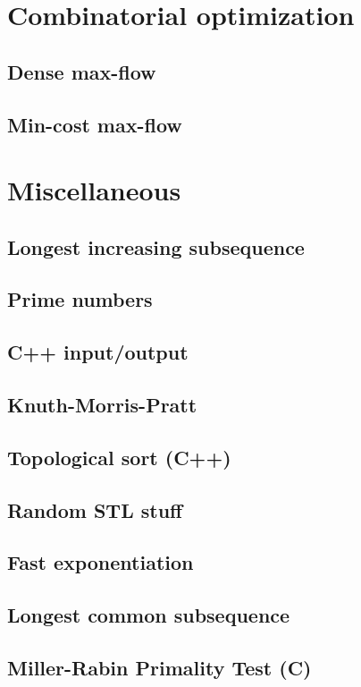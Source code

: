 \section{Combinatorial optimization}
\subsection{Dense max-flow}
\raggedbottom
\hrulefill
\subsection{Min-cost max-flow}
\raggedbottom
\hrulefill

\section{Miscellaneous}
\subsection{Longest increasing subsequence}
\raggedbottom
\hrulefill
\subsection{Prime numbers}
\raggedbottom
\hrulefill
\subsection{C++ input/output}
\raggedbottom
\hrulefill
\subsection{Knuth-Morris-Pratt}
\raggedbottom
\hrulefill
\subsection{Topological sort (C++)}
\raggedbottom
\hrulefill
\subsection{Random STL stuff}
\raggedbottom
\hrulefill
\subsection{Fast exponentiation}
\raggedbottom
\hrulefill
\subsection{Longest common subsequence}
\raggedbottom
\hrulefill
\subsection{Miller-Rabin Primality Test (C)}
\raggedbottom
\hrulefill

